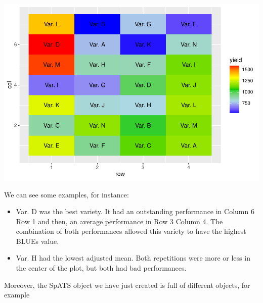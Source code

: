 \documentclass[
]{book}
\newenvironment{Shaded}{\begin{snugshade}}{\end{snugshade}}
\newcommand{\CommentTok}[1]{\textcolor[rgb]{0.56,0.35,0.01}{\textit{#1}}}
\newcommand{\NormalTok}[1]{#1}
\newcommand{\SpecialCharTok}[1]{\textcolor[rgb]{0.00,0.00,0.00}{#1}}
\begin{document}
\includegraphics{PPB-Toolkit-for-R-and-R-Studio_files/figure-latex/unnamed-chunk-115-1.pdf}

We can see some examples, for instance:

\begin{itemize}
\item
  Var. D was the best variety. It had an outstanding performance in Column 6 Row 1 and then, an average performance in Row 3 Column 4. The combination of both performances allowed this variety to have the highest BLUEs value.
\item
  Var. H had the lowest adjusted mean. Both repetitions were more or less in the center of the plot, but both had bad performances.
\end{itemize}

Moreover, the SpATS object we have just created is full of different objects, for example

\begin{Shaded}
\end{Shaded}
\end{document}
